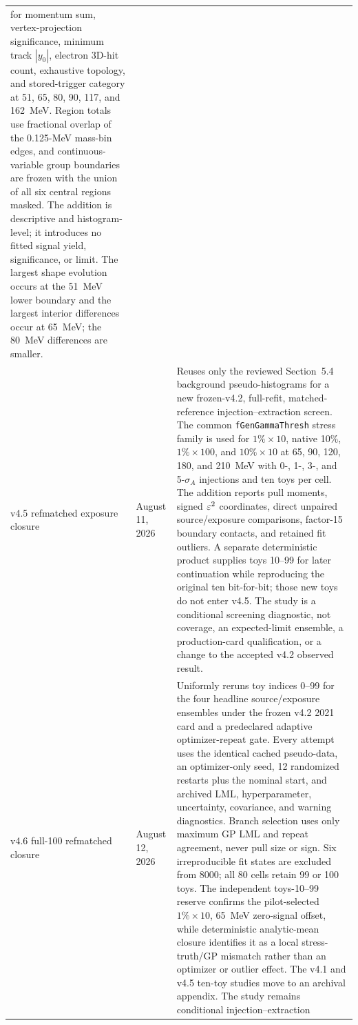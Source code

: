 \begin{longtable}{P{0.11\textwidth}P{0.16\textwidth}P{0.64\textwidth}}
for momentum sum, vertex-projection significance, minimum track $|y_0|$,
electron 3D-hit count, exhaustive topology, and stored-trigger category at
51, 65, 80, 90, 117, and 162~MeV.  Region totals use fractional overlap of
the 0.125-MeV mass-bin edges, and continuous-variable group boundaries are
frozen with the union of all six central regions masked.  The addition is
descriptive and histogram-level; it introduces no fitted signal yield,
significance, or limit.  The largest shape evolution occurs at the 51~MeV
lower boundary and the largest interior differences occur at 65~MeV; the
80~MeV differences are smaller. \\
\addlinespace
v4.5 refmatched exposure closure & August 11, 2026 &
Reuses only the reviewed Section~5.4 background pseudo-histograms for a new
frozen-v4.2, full-refit, matched-reference injection--extraction screen.  The
common \texttt{fGenGammaThresh} stress family is used for $1\%\times10$,
native 10\%, $1\%\times100$, and $10\%\times10$ at 65, 90, 120, 180, and
210~MeV with 0-, 1-, 3-, and 5-$\sigma_A$ injections and ten toys per cell.
The addition reports pull moments, signed $\varepsilon^2$ coordinates, direct unpaired
source/exposure comparisons, factor-15 boundary contacts, and retained fit
outliers.  A separate deterministic product supplies toys 10--99 for later
continuation while reproducing the original ten bit-for-bit; those new toys do
not enter v4.5.  The study is a conditional screening diagnostic, not coverage,
an expected-limit ensemble, a production-card qualification, or a change to the
accepted v4.2 observed result. \\
\addlinespace
v4.6 full-100 refmatched closure & August 12, 2026 &
Uniformly reruns toy indices 0--99 for the four headline source/exposure
ensembles under the frozen v4.2 2021 card and a predeclared adaptive
optimizer-repeat gate.  Every attempt uses the identical cached pseudo-data,
an optimizer-only seed, 12 randomized restarts plus the nominal start, and
archived LML, hyperparameter, uncertainty, covariance, and warning diagnostics.
Branch selection uses only maximum GP LML and repeat agreement, never pull size
or sign.  Six irreproducible fit states are excluded from 8000; all 80 cells
retain 99 or 100 toys.  The independent toys-10--99 reserve confirms the
pilot-selected $1\%\times10$, 65~MeV zero-signal offset, while deterministic
analytic-mean closure identifies it as a local stress-truth/GP mismatch rather
than an optimizer or outlier effect.  The v4.1 and v4.5 ten-toy studies move to
an archival appendix.  The study remains conditional injection--extraction

\end{longtable}
